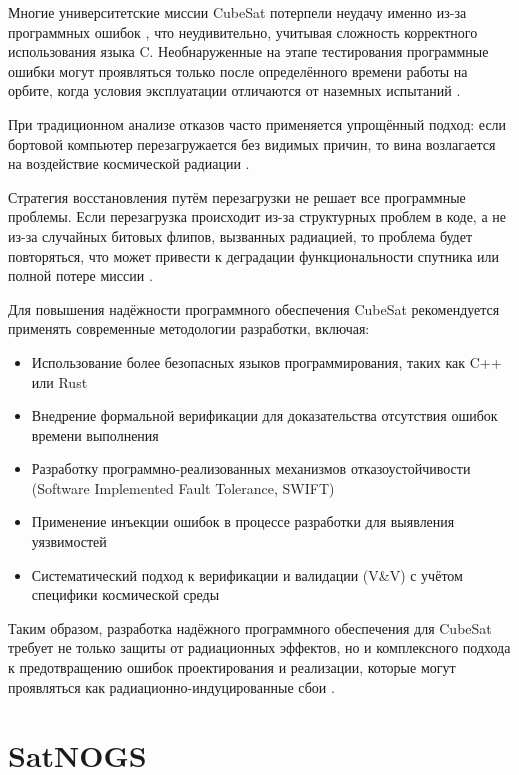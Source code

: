 Многие университетские миссии CubeSat потерпели неудачу именно из-за программных ошибок \cite{guo2014flight}, что неудивительно, учитывая сложность корректного использования языка C. Необнаруженные на этапе тестирования программные ошибки могут проявляться только после определённого времени работы на орбите, когда условия эксплуатации отличаются от наземных испытаний \cite{dubey2009evaluating}.

При традиционном анализе отказов часто применяется упрощённый подход: если бортовой компьютер перезагружается без видимых причин, то вина возлагается на воздействие космической радиации \cite{maurer2008harsh}.

Стратегия восстановления путём перезагрузки не решает все программные проблемы. Если перезагрузка происходит из-за структурных проблем в коде, а не из-за случайных битовых флипов, вызванных радиацией, то проблема будет повторяться, что может привести к деградации функциональности спутника или полной потере миссии \cite{lee2019dependable}.

Для повышения надёжности программного обеспечения CubeSat рекомендуется применять современные методологии разработки, включая:

\begin{itemize}
	\item Использование более безопасных языков программирования, таких как C++ или Rust \cite{chapman2014high}
	\item Внедрение формальной верификации для доказательства отсутствия ошибок времени выполнения \cite{jacobs2015introduction}
	\item Разработку программно-реализованных механизмов отказоустойчивости (Software Implemented Fault Tolerance, SWIFT) \cite{reis2005swift}
	\item Применение инъекции ошибок в процессе разработки для выявления уязвимостей \cite{benso2011principles}
	\item Систематический подход к верификации и валидации (V\&V) с учётом специфики космической среды \cite{nasa2004nasa}
\end{itemize}

Таким образом, разработка надёжного программного обеспечения для CubeSat требует не только защиты от радиационных эффектов, но и комплексного подхода к предотвращению ошибок проектирования и реализации, которые могут проявляться как радиационно-индуцированные сбои \cite{hsueh1997fault}.


\section{SatNOGS}

